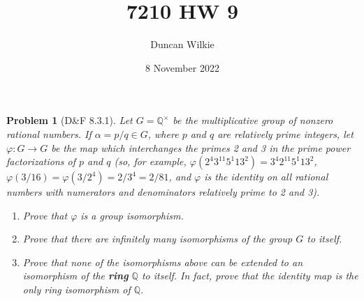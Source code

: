 \documentclass{article}
\title{7210 HW 9}
\author{Duncan Wilkie}
\date{8 November 2022}
\newtheorem{plm}{Problem}
\begin{document}
\maketitle

\begin{plm}[D\&F 8.3.1]
  Let $G = \mathbb{Q}^{\times}$ be the multiplicative group of nonzero rational numbers.
  If $\alpha = p/q \in G$, where $p$ and $q$ are relatively prime integers, let $\varphi: G \to G$ be the map which interchanges the primes 2 and 3
  in the prime power factorizations of $p$ and $q$ (so, for example, $\varphi(2^{4}3^{11}5^{1}13^{2}) = 3^{4}2^{11}5^{1}13^{2}$,
  $\varphi(3/16) = \varphi(3/2^{4}) = 2/3^{4} = 2/81$, and $\varphi$ is the identity on all rational numbers with numerators and denominators
  relatively prime to 2 and 3).
  \begin{enumerate}
  \item Prove that $\varphi$ is a group isomorphism.
  \item Prove that there are infinitely many isomorphisms of the group $G$ to itself.
  \item Prove that none of the isomorphisms above can be extended to an isomorphism of the \textbf{ring} $\mathbb{Q}$ to itself.
    In fact, prove that the identity map is the only ring isomorphism of $\mathbb{Q}$.
  \end{enumerate}
\end{plm}
\end{document}
